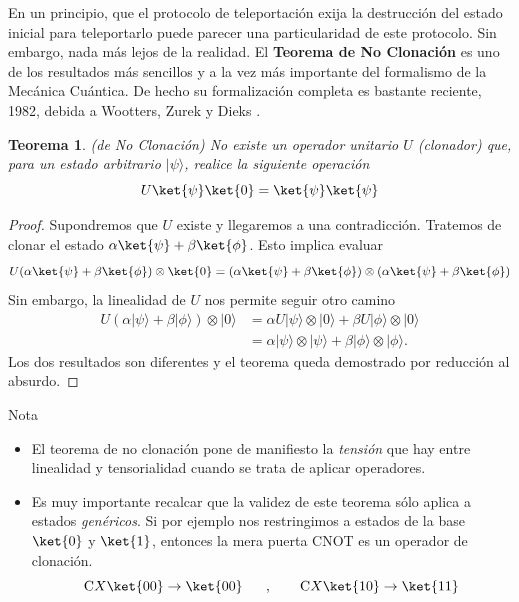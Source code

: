 \documentclass[a4paper,11pt]{book} %
\newtheorem{teorema_contador}{Teorema}
\newcommand{\Teorema}[1]{
		\begin{mybox_gray2}{}
			\begin{teorema_contador}
				 #1 
			\end{teorema_contador} 
		\end{mybox_gray2}
	}
\numberwithin{equation}{chapter}
\newcommand{\cg}[1]{{\rm C}#1}
\begin{document}
	En un principio, que el protocolo de teleportación exija la destrucción del estado inicial para teleportarlo puede parecer una particularidad de este protocolo. Sin embargo, nada más lejos de la realidad.
	El \textbf{Teorema de No Clonación} es uno de los resultados más sencillos y a la vez más importante del formalismo de la Mecánica Cuántica. De hecho su formalización completa es bastante reciente, 1982, debida a Wootters, Zurek \cite{bib_clone2} y Dieks \cite{bib_clone1}.
	
	\Teorema{ (\textit{de No Clonación})
	No existe un operador unitario $U$ (clonador) que, para un estado arbitrario $|\psi\rangle$, realice la siguiente operación
		\begin{equation}
		U \ket{\psi}\ket{0} = \ket{\psi}\ket{\psi}
		\end{equation}
	}

	\begin{proof}
	Supondremos que $U$ existe y llegaremos a una contradicción. 
	Tratemos de clonar el estado $\alpha\ket{\psi}+\beta\ket{\phi}$. Esto implica evaluar
		\begin{equation*}
		U (\alpha\ket{\psi}+\beta\ket{\phi})\otimes \ket{0} = 	(\alpha\ket{\psi}+\beta\ket{\phi})\otimes (\alpha\ket{\psi}+\beta\ket{\phi})
		\end{equation*}	
	Sin embargo, la linealidad de $U$ nos permite seguir otro camino
		\begin{align*}
		U(\alpha|\psi\rangle+\beta|\phi\rangle) \otimes|0\rangle 
			& = \alpha U|\psi\rangle \otimes|0\rangle+\beta U|\phi\rangle \otimes|0\rangle  \\
			& = \alpha|\psi\rangle \otimes|\psi\rangle+\beta|\phi\rangle \otimes|\phi\rangle . 
		\end{align*}
	Los dos resultados son diferentes y el teorema queda demostrado por reducción al absurdo.
	\end{proof}


	\begin{mybox_blue}{Nota}
	\begin{itemize}
		\item El teorema de no clonación pone  de manifiesto la  \textit{tensión} que hay entre linealidad y tensorialidad cuando se trata de aplicar operadores.
		\item Es muy importante recalcar que la validez de este teorema sólo aplica a estados \textit{genéricos}. 
	Si por ejemplo nos restringimos a estados de la base $\ket{0}$ y $\ket{1}$, entonces la mera puerta CNOT es un operador de clonación.
    $$
	\cg{X}\ket{00}\to \ket{00}~~~~~,~~~~~~ \cg{X}\ket{10}\to \ket{11}
	$$
	\end{itemize}		 
	\end{mybox_blue}
\end{document}
